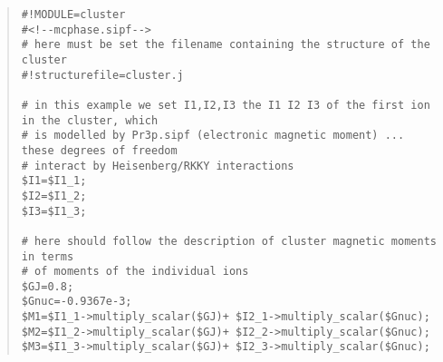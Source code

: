 \begin{quote}
\begin{verbatim}
#!MODULE=cluster
#<!--mcphase.sipf-->
# here must be set the filename containing the structure of the cluster
#!structurefile=cluster.j

# in this example we set I1,I2,I3 the I1 I2 I3 of the first ion in the cluster, which 
# is modelled by Pr3p.sipf (electronic magnetic moment) ... these degrees of freedom
# interact by Heisenberg/RKKY interactions
$I1=$I1_1;
$I2=$I1_2;
$I3=$I1_3;

# here should follow the description of cluster magnetic moments in terms
# of moments of the individual ions
$GJ=0.8;
$Gnuc=-0.9367e-3;
$M1=$I1_1->multiply_scalar($GJ)+ $I2_1->multiply_scalar($Gnuc);
$M2=$I1_2->multiply_scalar($GJ)+ $I2_2->multiply_scalar($Gnuc);
$M3=$I1_3->multiply_scalar($GJ)+ $I2_3->multiply_scalar($Gnuc); 
\end{verbatim}


\end{quote}
